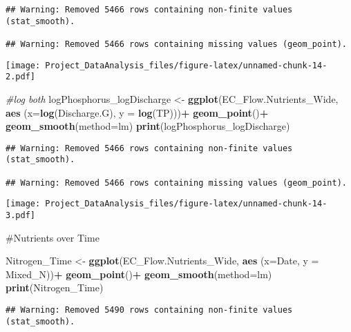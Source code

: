 \documentclass[]{article}
\newenvironment{Shaded}{\begin{snugshade}}{\end{snugshade}}
\newcommand{\CommentTok}[1]{\textcolor[rgb]{0.56,0.35,0.01}{\textit{#1}}}
\newcommand{\DataTypeTok}[1]{\textcolor[rgb]{0.13,0.29,0.53}{#1}}
\newcommand{\KeywordTok}[1]{\textcolor[rgb]{0.13,0.29,0.53}{\textbf{#1}}}
\newcommand{\NormalTok}[1]{#1}
\newcommand{\OperatorTok}[1]{\textcolor[rgb]{0.81,0.36,0.00}{\textbf{#1}}}
\newcommand{\StringTok}[1]{\textcolor[rgb]{0.31,0.60,0.02}{#1}}
\begin{document}
\begin{verbatim}
## Warning: Removed 5466 rows containing non-finite values (stat_smooth).

## Warning: Removed 5466 rows containing missing values (geom_point).
\end{verbatim}

\texttt{[image: Project\_DataAnalysis\_files/figure-latex/unnamed-chunk-14-2.pdf]}

\begin{Shaded}
\begin{Highlighting}[]
\CommentTok{#log both }
\NormalTok{logPhosphorus_logDischarge <-}\StringTok{ }
\StringTok{  }\KeywordTok{ggplot}\NormalTok{(EC_Flow.Nutrients_Wide, }\KeywordTok{aes}\NormalTok{ (}\DataTypeTok{x=}\KeywordTok{log}\NormalTok{(Discharge.G), }\DataTypeTok{y =} \KeywordTok{log}\NormalTok{(TP)))}\OperatorTok{+}
\StringTok{  }\KeywordTok{geom_point}\NormalTok{()}\OperatorTok{+}
\StringTok{  }\KeywordTok{geom_smooth}\NormalTok{(}\DataTypeTok{method=}\NormalTok{lm)}
\KeywordTok{print}\NormalTok{(logPhosphorus_logDischarge)}
\end{Highlighting}
\end{Shaded}

\begin{verbatim}
## Warning: Removed 5466 rows containing non-finite values (stat_smooth).

## Warning: Removed 5466 rows containing missing values (geom_point).
\end{verbatim}

\texttt{[image: Project\_DataAnalysis\_files/figure-latex/unnamed-chunk-14-3.pdf]}

\#Nutrients over Time

\begin{Shaded}
\begin{Highlighting}[]
\NormalTok{Nitrogen_Time <-}\StringTok{ }
\StringTok{  }\KeywordTok{ggplot}\NormalTok{(EC_Flow.Nutrients_Wide, }\KeywordTok{aes}\NormalTok{ (}\DataTypeTok{x=}\NormalTok{Date, }\DataTypeTok{y =}\NormalTok{ Mixed_N))}\OperatorTok{+}
\StringTok{  }\KeywordTok{geom_point}\NormalTok{()}\OperatorTok{+}
\StringTok{  }\KeywordTok{geom_smooth}\NormalTok{(}\DataTypeTok{method=}\NormalTok{lm)}
\KeywordTok{print}\NormalTok{(Nitrogen_Time)}
\end{Highlighting}
\end{Shaded}

\begin{verbatim}
## Warning: Removed 5490 rows containing non-finite values (stat_smooth).
\end{verbatim}
\end{document}
